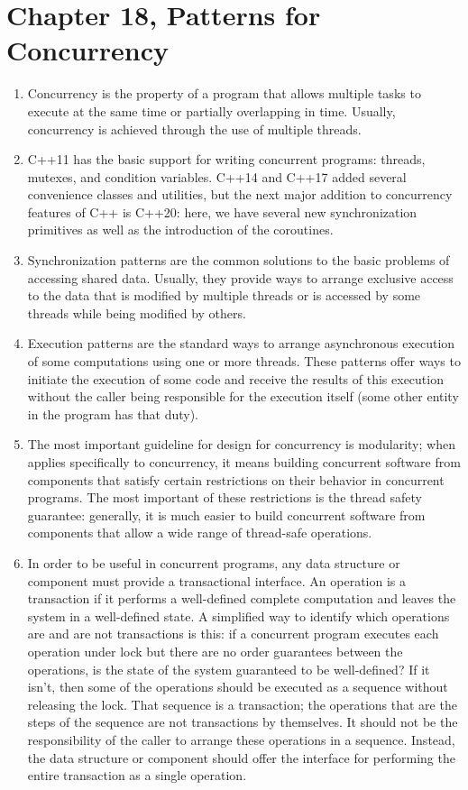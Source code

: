 \section{Chapter 18, Patterns for Concurrency}

\begin{enumerate}
\item
  Concurrency is the property of a program that allows multiple tasks to execute at the same time or partially overlapping in time. Usually, concurrency is achieved through the use of multiple threads.
\item
  C++11 has the basic support for writing concurrent programs: threads, mutexes, and condition variables. C++14 and C++17 added several convenience classes and utilities, but the next major addition to concurrency features of C++ is C++20: here, we have several new synchronization primitives as well as the introduction of the coroutines.
\item
  Synchronization patterns are the common solutions to the basic problems of accessing shared data. Usually, they provide ways to arrange exclusive access to the data that is modified by multiple threads or is accessed by some threads while being modified by others.
\item
  Execution patterns are the standard ways to arrange asynchronous execution of some computations using one or more threads. These patterns offer ways to initiate the execution of some code and receive the results of this execution without the caller being responsible for the execution itself (some other entity in the program has that duty).
\item
  The most important guideline for design for concurrency is modularity; when applies specifically to concurrency, it means building concurrent software from components that satisfy certain restrictions on their behavior in concurrent programs. The most important of these restrictions is the thread safety guarantee: generally, it is much easier to build concurrent software from components that allow a wide range of thread-safe operations.
\item
  In order to be useful in concurrent programs, any data structure or component must provide a transactional interface. An operation is a transaction if it performs a well-defined complete computation and leaves the system in a well-defined state. A simplified way to identify which operations are and are not transactions is this: if a concurrent program executes each operation under lock but there are no order guarantees between the operations, is the state of the system guaranteed to be well-defined? If it isn't, then some of the operations should be executed as a sequence without releasing the lock. That sequence is a transaction; the operations that are the steps of the sequence are not transactions by themselves. It should not be the responsibility of the caller to arrange these operations in a sequence. Instead, the data structure or component should offer the interface for performing the entire transaction as a single operation.
\end{enumerate}


